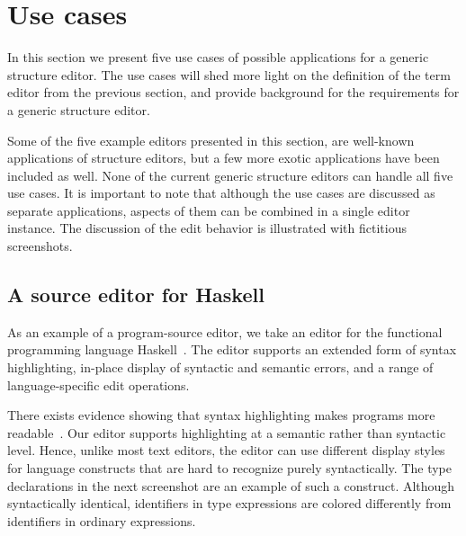 \documentclass{speauth}
\begin{document}
\newcommand{\editStepScrshotChk}[4]{%
\editStepScrshot{#1}{#2}{#3}{#4}
\begin{center}
$\Rightarrow$\\
{#4}
\end{center}
}

\newcommand{\editStepScrshotSz}[5]{%
\editStepScrshot{\parbox{#1}{#2}}{\parbox{#1}{#3}}{#4}{#5}
}


\section{Use cases} 
\label{usecases}

In this section we present five use cases of possible applications for a generic structure editor. The use cases will shed more light on the definition of the term editor from the previous section, and provide background for the requirements for a generic structure editor. 

Some of the five example editors presented in this section, are well-known applications of structure editors, but a few more exotic applications have been included as well. None of the current generic structure editors can handle all five use cases. It is important to note that although the use cases are discussed as separate applications, aspects of them can be combined in a single editor instance.
The discussion of the edit behavior is illustrated with fictitious screenshots. %

\subsection{A source editor for Haskell}  
\label{sect:sourceeditor} 
As an example of a program-source editor, we take an editor for the functional programming language Haskell~\cite{peytonJones03haskell}. The editor supports an extended form of syntax highlighting, in-place display of syntactic and semantic errors, and a range of language-specific edit operations. 

There exists evidence showing that syntax highlighting makes programs more readable~\cite{baecker88readability,omanCook90typography}. Our editor supports highlighting at a semantic rather than syntactic level. Hence, unlike most text editors, the editor can use different display styles for language constructs that are hard to recognize purely syntactically. The type declarations in the next screenshot are an example of such a construct. Although syntactically identical, identifiers in type expressions are colored differently from identifiers in ordinary expressions.
\end{document}
